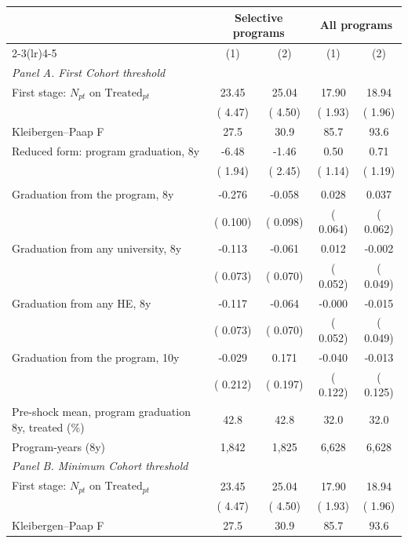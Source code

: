 \begin{tabular}{lcccc}
\toprule
 & \multicolumn{2}{c}{Selective programs} & \multicolumn{2}{c}{All programs} \\
\cmidrule(lr){2-3}\cmidrule(lr){4-5}
 & (1) & (2) & (1) & (2) \\
\midrule
\multicolumn{5}{l}{\textit{Panel A. First Cohort threshold}} \\
First stage: \(N_{pt}\) on \(\text{Treated}_{pt}\) &  23.45\sym{***} &  25.04\sym{***} &  17.90\sym{***} &  18.94\sym{***} \\
 & (  4.47) & (  4.50) & (  1.93) & (  1.96) \\
Kleibergen--Paap F &   27.5 &   30.9 &   85.7 &   93.6 \\
\addlinespace
Reduced form: program graduation, 8y &  -6.48\sym{***} &  -1.46 &   0.50 &   0.71 \\
 & (  1.94) & (  2.45) & (  1.14) & (  1.19) \\
\addlinespace
\multicolumn{5}{l}{2SLS: pp of graduation per additional entrant} \\
\quad Graduation from the program, 8y & -0.276\sym{***} & -0.058 &  0.028 &  0.037 \\
 & ( 0.100) & ( 0.098) & ( 0.064) & ( 0.062) \\
\quad Graduation from any university, 8y & -0.113 & -0.061 &  0.012 & -0.002 \\
 & ( 0.073) & ( 0.070) & ( 0.052) & ( 0.049) \\
\quad Graduation from any HE, 8y & -0.117 & -0.064 & -0.000 & -0.015 \\
 & ( 0.073) & ( 0.070) & ( 0.052) & ( 0.049) \\
\quad Graduation from the program, 10y & -0.029 &  0.171 & -0.040 & -0.013 \\
 & ( 0.212) & ( 0.197) & ( 0.122) & ( 0.125) \\
\addlinespace
Pre-shock mean, program graduation 8y, treated (\%) &  42.8 &  42.8 &  32.0 &  32.0 \\
Program-years (8y) &  1,842 &  1,825 &  6,628 &  6,628 \\
\midrule
\multicolumn{5}{l}{\textit{Panel B. Minimum Cohort threshold}} \\
First stage: \(N_{pt}\) on \(\text{Treated}_{pt}\) &  23.45\sym{***} &  25.04\sym{***} &  17.90\sym{***} &  18.94\sym{***} \\
 & (  4.47) & (  4.50) & (  1.93) & (  1.96) \\
Kleibergen--Paap F &   27.5 &   30.9 &   85.7 &   93.6 \\

\end{tabular}
